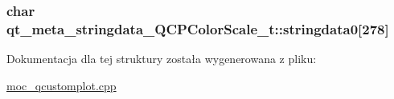 \subsubsection[{\texorpdfstring{stringdata0}{stringdata0}}]{\setlength{\rightskip}{0pt plus 5cm}char qt\+\_\+meta\+\_\+stringdata\+\_\+\+Q\+C\+P\+Color\+Scale\+\_\+t\+::stringdata0\mbox{[}278\mbox{]}}\hypertarget{structqt__meta__stringdata___q_c_p_color_scale__t_a0ed4cd437d62f56ea375637ec624a59c}{}\label{structqt__meta__stringdata___q_c_p_color_scale__t_a0ed4cd437d62f56ea375637ec624a59c}


Dokumentacja dla tej struktury została wygenerowana z pliku\+:\begin{DoxyCompactItemize}
\item 
\hyperlink{moc__qcustomplot_8cpp}{moc\+\_\+qcustomplot.\+cpp}\end{DoxyCompactItemize}
